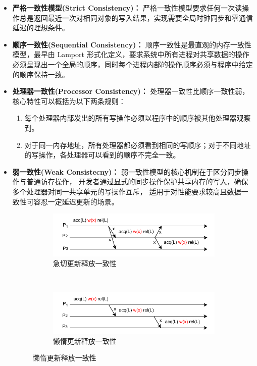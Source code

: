 {    \begin{itemize}
        \item \textbf{严格一致性模型(Strict Consistency)：} 严格一致性模型要求任何一次读操作总是返回最近一次对相同对象的写入结果，实现需要全局时钟同步和零通信延迟的理想条件。

        \item \textbf{顺序一致性(Sequential Consistency)：} 顺序一致性是最直观的内存一致性模型，最早由 Lamport 形式化定义，要求系统中所有进程对共享数据的操作必须呈现出一个全局的顺序，同时每个进程内部的操作顺序必须与程序中给定的顺序保持一致。

        \item \textbf{处理器一致性(Processor Consistency)：} 处理器一致性比顺序一致性弱，核心特性可以概括为以下两条规则：
              \begin{enumerate}[label=\arabic*.]
                  \item 每个处理器内部发出的所有写操作必须以程序中的顺序被其他处理器观察到。
                  \item 对于同一内存地址，所有处理器都必须看到相同的写顺序；对于不同地址的写操作，各处理器可以看到的顺序不完全一致。
              \end{enumerate}

        \item \textbf{弱一致性(Weak Consistecny)：} 弱一致性模型的核心机制在于区分同步操作与普通访存操作，
              开发者通过显式的同步操作保护共享内存的写入，确保多个处理器对同一共享单元的写操作互斥，
              适用于对性能要求较高且数据一致性可容忍一定延迟更新的场景。

              \begin{figure}[!htbp]
                  \centering
                  \begin{subfigure}[b]{0.8\textwidth}
                      \includegraphics[width=\textwidth]{Img/急切更新.drawio.pdf}
                      \caption{急切更新释放一致性}
                      \label{fig:eager-release-consistency}
                  \end{subfigure}
                  \\
                  \begin{subfigure}[b]{0.8\textwidth}
                      \includegraphics[width=\textwidth]{Img/懒惰更新.drawio.pdf}
                      \caption{懒惰更新释放一致性}
                      \label{fig:lazy-release-consistency}
                  \end{subfigure}


\end{figure}
\end{itemize}}

